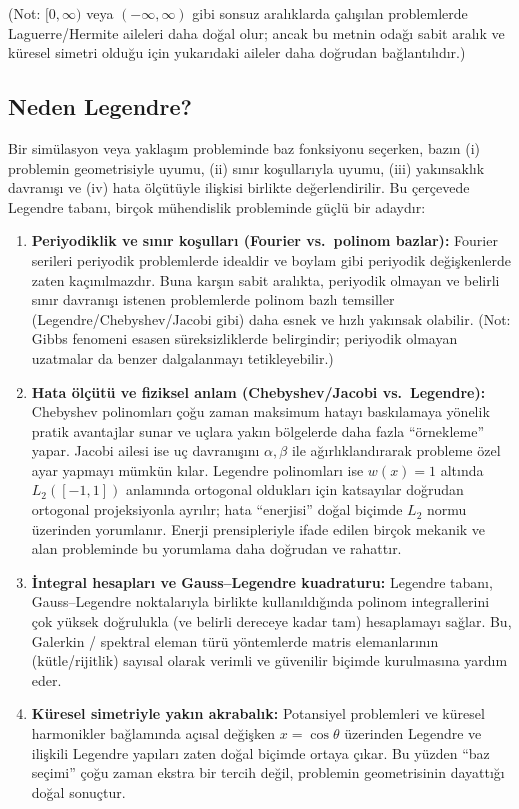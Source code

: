\noindent (Not: $[0,\infty)$ veya $(-\infty,\infty)$ gibi sonsuz aralıklarda çalışılan problemlerde
Laguerre/Hermite aileleri daha doğal olur; ancak bu metnin odağı sabit aralık ve küresel simetri olduğu için
yukarıdaki aileler daha doğrudan bağlantılıdır.)

\subsection{Neden Legendre?}

Bir simülasyon veya yaklaşım probleminde baz fonksiyonu seçerken,
bazın (i) problemin geometrisiyle uyumu, (ii) sınır koşullarıyla uyumu,
(iii) yakınsaklık davranışı ve (iv) hata ölçütüyle ilişkisi birlikte değerlendirilir.
Bu çerçevede Legendre tabanı, birçok mühendislik probleminde güçlü bir adaydır:

\begin{enumerate}
    \item \textbf{Periyodiklik ve sınır koşulları (Fourier vs.\ polinom bazlar):}
    Fourier serileri periyodik problemlerde idealdir ve boylam gibi periyodik değişkenlerde zaten kaçınılmazdır.
    Buna karşın sabit aralıkta, periyodik olmayan ve belirli sınır davranışı istenen problemlerde
    polinom bazlı temsiller (Legendre/Chebyshev/Jacobi gibi) daha esnek ve hızlı yakınsak olabilir.
    (Not: Gibbs fenomeni esasen süreksizliklerde belirgindir; periyodik olmayan uzatmalar da benzer dalgalanmayı tetikleyebilir.)

    \item \textbf{Hata ölçütü ve fiziksel anlam (Chebyshev/Jacobi vs.\ Legendre):}
    Chebyshev polinomları çoğu zaman maksimum hatayı baskılamaya yönelik pratik avantajlar sunar
    ve uçlara yakın bölgelerde daha fazla ``örnekleme'' yapar.
    Jacobi ailesi ise uç davranışını $\alpha,\beta$ ile ağırlıklandırarak probleme özel ayar yapmayı mümkün kılar.
    Legendre polinomları ise $w(x)=1$ altında $L_2([-1,1])$ anlamında ortogonal oldukları için
    katsayılar doğrudan ortogonal projeksiyonla ayrılır;
    hata ``enerjisi'' doğal biçimde $L_2$ normu üzerinden yorumlanır.
    Enerji prensipleriyle ifade edilen birçok mekanik ve alan probleminde bu yorumlama daha doğrudan ve rahattır.

    \item \textbf{İntegral hesapları ve Gauss--Legendre kuadraturu:}
    Legendre tabanı, Gauss--Legendre noktalarıyla birlikte kullanıldığında
    polinom integrallerini çok yüksek doğrulukla (ve belirli dereceye kadar tam) hesaplamayı sağlar.
    Bu, Galerkin / spektral eleman türü yöntemlerde
    matris elemanlarının (kütle/rijitlik) sayısal olarak verimli ve güvenilir biçimde kurulmasına yardım eder.

    \item \textbf{Küresel simetriyle yakın akrabalık:}
    Potansiyel problemleri ve küresel harmonikler bağlamında
    açısal değişken $x=\cos\theta$ üzerinden Legendre ve ilişkili Legendre yapıları zaten doğal biçimde ortaya çıkar.
    Bu yüzden ``baz seçimi'' çoğu zaman ekstra bir tercih değil, problemin geometrisinin dayattığı doğal sonuçtur.
\end{enumerate}



